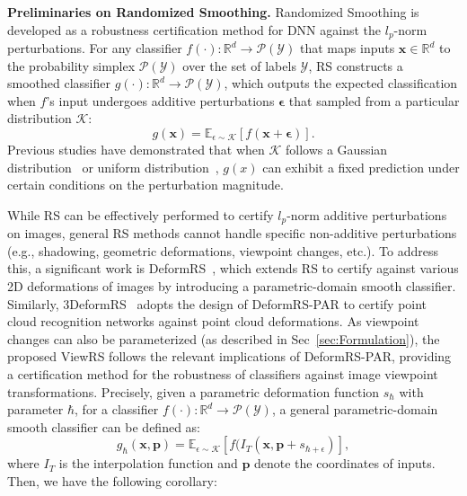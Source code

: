 \documentclass[10pt,journal,compsoc]{IEEEtran}
\begin{document}
\textbf{Preliminaries on Randomized Smoothing.} Randomized Smoothing is developed as a robustness certification method for DNN against the $l_p$-norm perturbations. For any classifier $f(\cdot):\mathbb{R}^d\rightarrow \mathcal{P}(\mathcal{Y})$ that maps inputs $\mathbf{x}\in \mathbb{R}^d$ to the probability simplex $\mathcal{P}(\mathcal{Y})$ over the
set of labels $\mathcal{Y}$, RS constructs a smoothed classifier $g(\cdot):\mathbb{R}^d\rightarrow \mathcal{P}(\mathcal{Y})$, which outputs the expected classification when $f$'s input undergoes additive perturbations $\boldsymbol{\epsilon}$ that sampled from a particular distribution $\mathcal{K}$:
\begin{equation}
    g(\mathbf{x}) = \mathbb{E}_{\epsilon \sim \mathcal{K}}[f(\mathbf{x}+\boldsymbol{\epsilon})].
\end{equation}
Previous studies have demonstrated that when $\mathcal{K}$  follows a Gaussian distribution~\cite{zhai2020macer} or uniform distribution~\cite{yang2020randomized}, $g(x) $ can exhibit a fixed prediction under certain conditions on the perturbation magnitude. 

While RS can be effectively performed to certify $l_p$-norm additive perturbations on images, general RS methods cannot handle specific non-additive perturbations (e.g., shadowing, geometric deformations, viewpoint changes, etc.). To address this, a significant work is DeformRS~\cite{alfarra2022deformrs}, which extends RS to certify against various 2D deformations of images by introducing a parametric-domain smooth classifier. Similarly, 3DeformRS~\cite{perez20223deformrs} adopts the design of DeformRS-PAR to certify point cloud recognition networks against point cloud deformations. As viewpoint changes can also be parameterized (as described in Sec~\ref{sec:Formulation}), the proposed ViewRS follows the relevant implications of DeformRS-PAR, providing a certification method for the robustness of classifiers against image viewpoint transformations. Precisely, given a parametric deformation function $s_\hbar$ with parameter $\hbar$, for a classifier $f(\cdot):\mathbb{R}^d\rightarrow \mathcal{P}(\mathcal{Y})$, a general parametric-domain smooth classifier can be defined as:
\begin{equation}
    g_\hbar(\mathbf{x}, \mathbf{p}) = \mathbb{E}_{\epsilon \sim \mathcal{K}}[f(I_T(\mathbf{x}, \mathbf{p}+s_{\hbar+\epsilon} )],
\end{equation}
where $I_T$ is the interpolation function and $\mathbf{p}$ denote the coordinates of inputs. Then, we have the following corollary:
\end{document}
